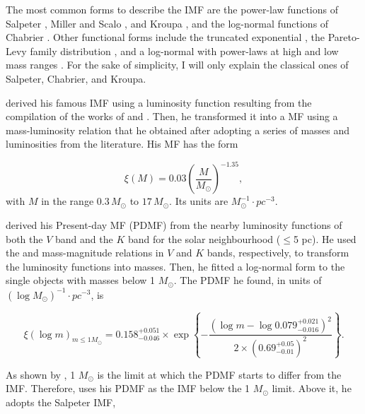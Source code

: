 The most common forms to describe the IMF are the power-law functions of Salpeter \citep{Salpeter1955}, Miller and Scalo \citep{1979ApJS...41..513M}, and Kroupa \citep{2001MNRAS.322..231K,2002Sci...295...82K,2013pss5.book..115K,Thies2007,2008MNRAS.390.1200T}, and the log-normal functions of Chabrier \citep{Chabrier2003a,Chabrier2003b,Chabrier2005}. Other functional forms include the truncated exponential \citep{2001AGM....18S0551D}, the Pareto-Levy family distribution \citep{2012MNRAS.423.1018C}, and a log-normal with power-laws at high and low mass ranges \citep{2013MNRAS.429.1725M}. For the sake of simplicity, I will only explain the classical ones of Salpeter, Chabrier, and Kroupa.

\citet{Salpeter1955} derived his famous IMF using a luminosity function resulting from the compilation of the works of \citet{1939POMin...7....1L,1941NYASA..42..201L} and \citet{1925PGro...38D...1V,1936PGro...47....1V}. Then, he transformed it into a MF using a mass-luminosity relation that he obtained after adopting a series of masses and luminosities from the literature. His MF has the form

\begin{equation}
\xi(M)=0.03 \left(\frac{M}{M_{\odot}}\right)^{-1.35},\nonumber
\end{equation}
with $M$ in the range $0.3\,M_{\odot}$ to  $17\,M_{\odot}$. Its units are $ M_{\odot}^{-1} \cdot pc^{-3}$.

\citet{Chabrier2003a,Chabrier2003b} derived his Present-day MF (PDMF) from the nearby luminosity functions of both the $V$ band \citep{1986AJ.....91..621D} and the $K$ band \citep{1990ApJ...350..334H} for the solar neighbourhood ($\leq$5 pc). He used the \citet{2000A&A...364..217D} and \citet{1998A&A...337..403B} mass-magnitude relations in $V$ and $K$ bands, respectively, to transform the luminosity functions into masses. Then, he fitted a log-normal form to the single objects with masses below 1 $M_{\odot}$. The PDMF he found, in units of $(\log M_{\odot})^{-1}\cdot pc^{-3}$, is 

\begin{equation}
\xi(\log m)_{m\leq1M_{\odot}}=0.158_{-0.046}^{+0.051} \times \exp{\left\{-\frac{(\log m - \log 0.079_{-0.016}^{+0.021})^2}{2 \times (0.69_{-0.01}^{+0.05})^2}\right\}}.\nonumber
\end{equation}

As shown by \citet{1986FCPh...11....1S}, 1 $M_{\odot}$ is the limit at which the PDMF starts to differ from the IMF. Therefore, \citet{Chabrier2003b} uses his PDMF as the IMF below the 1 $M_{\odot}$ limit. Above it, he adopts the Salpeter IMF,

